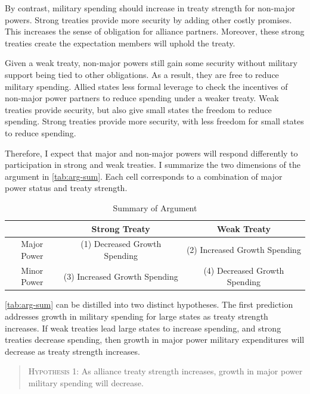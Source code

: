 \documentclass[12pt]{article}
\begin{document}
By contrast, military spending should increase in treaty strength for non-major powers. 
Strong treaties provide more security by adding other costly promises. 
This increases the sense of obligation for alliance partners. 
Moreover, these strong treaties create the expectation members will uphold the treaty. 


Given a weak treaty, non-major powers still gain some security without military support being tied to other obligations. 
As a result, they are free to reduce military spending. 
Allied states less formal leverage to check the incentives of non-major power partners to reduce spending under a weaker treaty. 
Weak treaties provide security, but also give small states the freedom to reduce spending. 
Strong treaties provide more security, with less freedom for small states to reduce spending. 


Therefore, I expect that major and non-major powers will respond differently to participation in strong and weak treaties. 
I summarize the two dimensions of the argument in \autoref{tab:arg-sum}. 
Each cell corresponds to a combination of major power status and treaty strength. 


\begin{table}
\begin{center}
\begin{tabular}{ccc}
      & Strong Treaty      & Weak Treaty  \\
\hline
Major Power & (1)  Decreased Growth Spending   & (2)  Increased Growth Spending        \\
\hline
Minor Power & (3) Increased Growth Spending   & (4) Decreased Growth Spending       \\ 
\hline 
\end{tabular}
\end{center}
\caption{Summary of Argument}
\label{tab:arg-sum}
\end{table}


\autoref{tab:arg-sum} can be distilled into two distinct hypotheses. 
The first prediction addresses growth in military spending for large states as treaty strength increases. 
If weak treaties lead large states to increase spending, and strong treaties decrease spending, then growth in major power military expenditures will decrease as treaty strength increases. 


\begin{quote}
\textsc{Hypothesis 1}: As alliance treaty strength increases, growth in major power military spending will decrease. 
\end{quote}
\end{document}
